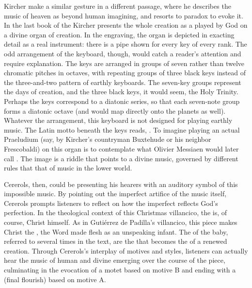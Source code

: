 Kircher make a similar gesture in a different passage, where he describes the
music of heaven as beyond human imagining, and resorts to paradox to evoke it.
In the last book of the  Kircher presents the whole creation as
a  played by God on a divine organ of creation.%
In the engraving, the organ is depicted in exacting detail as a real instrument:
there is a pipe shown for every key of every rank.
The odd arrangement of the keyboard, though, would catch a reader's attention
and require explanation.
The keys are arranged in groups of seven rather than twelve chromatic pitches in
octaves, with repeating groups of three black keys instead of the three-and-two
pattern of earthly keyboards. 
The seven-key groups represent the days of creation, and the three black keys,
it would seem, the Holy Trinity. 
Perhaps the keys correspond to a diatonic series, so that each seven-note group
forms a diatonic octave (and would map directly onto the planets as well).
Whatever the arrangement, this keyboard is not designed for playing earthly
music.
The Latin motto beneath the keys reads, .%
\citXXX[Apocrypha?]
To imagine playing an actual Praeludium (say, by Kircher's countryman Buxtehude
or his neighbor Frescobaldi) on this organ is to contemplate what Olivier
Messiaen would later call .%
The image is a riddle that points to a divine music, governed by different rules
that that of music in the lower world.

Cererols, then, could be presenting his hearers with an auditory symbol of this
impossible music.
By pointing out the imperfect artifice of the music itself, Cererols prompts
listeners to reflect on how the imperfect reflects God's perfection.
In the theological context of this Christmas villancico, the  is, of course, Christ himself.
As in Gutiérrez de Padilla's villancico, this piece makes Christ the
, the Word made flesh as an unspeaking infant.
The  of the baby, referred to several times in the text, are the
 that becomes the  of a renewed creation.
Through Cererols's interplay of motives and styles, listeners can actually hear
the music of human and divine emerging over the course of the piece, culminating
in the evocation of a motet based on motive B and ending with a 
(final flourish) based on motive A.

